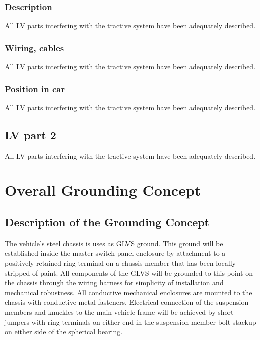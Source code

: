 \documentclass{article}
\begin{document}
\subsubsection{Description}
All LV parts interfering with the tractive system have been adequately described. 

\subsubsection*{Wiring, cables}
All LV parts interfering with the tractive system have been adequately described. 

\subsubsection{Position in car}
All LV parts interfering with the tractive system have been adequately described. 

\subsection{LV part 2}
All LV parts interfering with the tractive system have been adequately described. 

\section{Overall Grounding Concept}\label{overall_grounding_concept}
\subsection{Description of the Grounding Concept}
The vehicle's steel chassis is uses as GLVS ground. This ground will be established inside the master switch panel enclosure by attachment to a positively-retained ring terminal on a chassis member that has been locally stripped of paint. All components of the GLVS will be grounded to this point on the chassis through the wiring harness for simplicity of installation and mechanical robustness. All conductive mechanical enclosures are mounted to the chassis with conductive metal fasteners. Electrical connection of the suspension members and knuckles to the main vehicle frame will be achieved by short jumpers with ring terminals on either end in the suspension member bolt stackup on either side of the spherical bearing.
\end{document}
